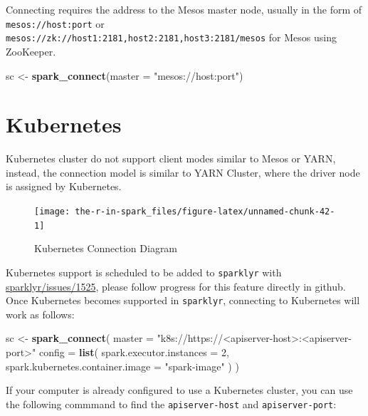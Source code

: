 \documentclass[]{book}
\newenvironment{Shaded}{\begin{snugshade}}{\end{snugshade}}
\newcommand{\DataTypeTok}[1]{\textcolor[rgb]{0.13,0.29,0.53}{#1}}
\newcommand{\DecValTok}[1]{\textcolor[rgb]{0.00,0.00,0.81}{#1}}
\newcommand{\KeywordTok}[1]{\textcolor[rgb]{0.13,0.29,0.53}{\textbf{#1}}}
\newcommand{\NormalTok}[1]{#1}
\newcommand{\StringTok}[1]{\textcolor[rgb]{0.31,0.60,0.02}{#1}}
\theoremstyle{definition}
\theoremstyle{definition}
\theoremstyle{definition}
\theoremstyle{remark}
\begin{document}
Connecting requires the address to the Mesos master node, usually in the
form of \texttt{mesos://host:port} or
\texttt{mesos://zk://host1:2181,host2:2181,host3:2181/mesos} for Mesos
using ZooKeeper.

\begin{Shaded}
\begin{Highlighting}[]
\NormalTok{sc <-}\StringTok{ }\KeywordTok{spark_connect}\NormalTok{(}\DataTypeTok{master =} \StringTok{"mesos://host:port"}\NormalTok{)}
\end{Highlighting}
\end{Shaded}

\hypertarget{kubernetes-1}{%
\section{Kubernetes}\label{kubernetes-1}}

Kubernetes cluster do not support client modes similar to Mesos or YARN,
instead, the connection model is similar to YARN Cluster, where the
driver node is assigned by Kubernetes.

\begin{figure}

{\centering \texttt{[image: the-r-in-spark\_files/figure-latex/unnamed-chunk-42-1]} 

}

\caption{Kubernetes Connection Diagram}\label{fig:unnamed-chunk-42}
\end{figure}

Kubernetes support is scheduled to be added to \texttt{sparklyr} with
\href{https://github.com/rstudio/sparklyr/issues/1525}{sparklyr/issues/1525},
please follow progress for this feature directly in github. Once
Kubernetes becomes supported in \texttt{sparklyr}, connecting to
Kubernetes will work as follows:

\begin{Shaded}
\begin{Highlighting}[]
\NormalTok{sc <-}\StringTok{ }\KeywordTok{spark_connect}\NormalTok{(}
  \DataTypeTok{master =} \StringTok{"k8s://https://<apiserver-host>:<apiserver-port>"}
  \DataTypeTok{config =} \KeywordTok{list}\NormalTok{(}
    \DataTypeTok{spark.executor.instances =} \DecValTok{2}\NormalTok{,}
    \DataTypeTok{spark.kubernetes.container.image =} \StringTok{"spark-image"}
\NormalTok{  )}
\NormalTok{)}
\end{Highlighting}
\end{Shaded}

If your computer is already configured to use a Kubernetes cluster, you
can use the following commmand to find the \texttt{apiserver-host} and
\texttt{apiserver-port}:
\end{document}
